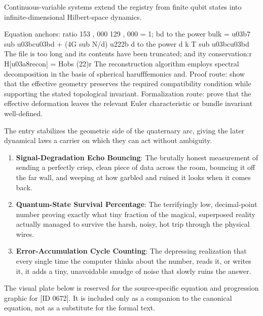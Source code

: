 Continuous-variable systems extend the registry from finite qubit states into infinite-dimensional Hilbert-space dynamics.

Equation anchors: ratio 153 , 000 129 , 000 = 1; bd to the power bulk = u03b7 sub u03bcu03bd + (4G sub N/d) u222b d to the power d k T sub u03bcu03bd The file is too long and its contents have been truncated; and ity conservation:r H[u03a8recon] = Hobs (22)r The reconstruction algorithm employs spectral decomposition in the basis of spherical harufffemonics and. Proof route: show that the effective geometry preserves the required compatibility condition while supporting the stated topological invariant. Formalization route: prove that the effective deformation leaves the relevant Euler characteristic or bundle invariant well-defined.

The entry stabilizes the geometric side of the quaternary arc, giving the later dynamical laws a carrier on which they can act without ambiguity.
\endgroup

\begin{enumerate}[leftmargin=1.6em,itemsep=6pt,topsep=4pt]
\item \textbf{Signal-Degradation Echo Bouncing}: The brutally honest measurement of sending a perfectly crisp, clean piece of data across the room, bouncing it off the far wall, and weeping at how garbled and ruined it looks when it comes back.
\item \textbf{Quantum-State Survival Percentage}: The terrifyingly low, decimal-point number proving exactly what tiny fraction of the magical, superposed reality actually managed to survive the harsh, noisy, hot trip through the physical wires.
\item \textbf{Error-Accumulation Cycle Counting}: The depressing realization that every single time the computer thinks about the number, reads it, or writes it, it adds a tiny, unavoidable smudge of noise that slowly ruins the answer.
\end{enumerate}

\begingroup\footnotesize\sloppy
The visual plate below is reserved for the source-specific equation and progression graphic for [ID 0672]. It is included only as a companion to the canonical equation, not as a substitute for the formal text.
\par\endgroup
\ifTZPDarkEdition
{}
\fi


